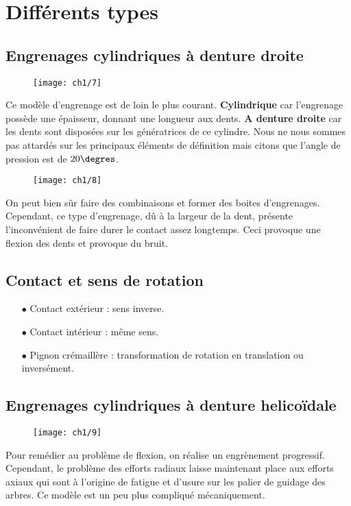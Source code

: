 \section{Différents types}
\subsection{Engrenages cylindriques à denture droite}
	\begin{wrapfigure}[5]{l}{2.5cm}
	\vspace{-5mm}
	\texttt{[image: ch1/7]}
	\end{wrapfigure}	
	\noindent Ce modèle d'engrenage est de loin le plus courant. \textbf{Cylindrique} car l'engrenage possède une épaisseur, donnant une longueur aux dents. \textbf{A denture droite} car les dents sont disposées sur les génératrices de ce cylindre. Nous ne nous sommes pas attardés sur les principaux éléments de définition mais citons que l'angle de pression est de $20\degres$. \\
	
	\begin{wrapfigure}[5]{r}{2.5cm}
	\vspace{-5mm}
	\texttt{[image: ch1/8]}
	\end{wrapfigure}	
	\noindent On peut bien sûr faire des combinaisons et former des boites d'engrenages. Cependant, ce type d'engrenage, dû à la largeur de la dent, présente l'inconvénient de faire durer le contact assez longtemps. Ceci provoque une flexion des dents et provoque du bruit.
	
\subsection{Contact et sens de rotation}
	\begin{itemize}
	\item[$\bullet$] Contact extérieur : sens inverse.
	\item[$\bullet$] Contact intérieur : même sens.
	\item[$\bullet$] Pignon crémaillère : transformation de rotation en translation ou inversément. 
	\end{itemize}
	
\subsection{Engrenages cylindriques à denture helicoïdale}
	\begin{wrapfigure}[5]{l}{2cm}
	\vspace{-5mm}
	\texttt{[image: ch1/9]}
	\end{wrapfigure}	
	\noindent Pour remédier au problème de flexion, on réalise un engrènement progressif. Cependant, le problème des efforts radiaux laisse maintenant place aux efforts axiaux qui sont à l'origine de fatigue et d'usure sur les palier de guidage des arbres. Ce modèle est un peu plus compliqué mécaniquement. \\
	
